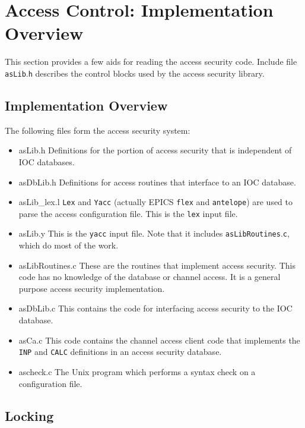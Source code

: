 \section{Access Control: Implementation Overview}

This section provides a few aids for reading the access security code. Include file \verb|asLib|.\verb|h| describes the control blocks 
used by the access security library. 

\subsection{Implementation Overview}

The following files form the access security system:

\begin{itemize}\item asLib.h  Definitions for the portion of access security that is independent of IOC databases.

\item asDbLib.h  Definitions for access routines that interface to an IOC database.

\item asLib\_lex.l   \verb|Lex| and \verb|Yacc| (actually EPICS \verb|flex| and \verb|antelope|) are used to parse the access configuration file. 
This is the \verb|lex| input file.

\item asLib.y   This is the \verb|yacc| input file. Note that it includes \verb|asLibRoutines|.\verb|c|, which do most of the work.

\item asLibRoutines.c   These are the routines that implement access security. This code has no knowledge of the 
database or channel access. It is a general purpose access security implementation.

\item asDbLib.c   This contains the code for interfacing access security to the IOC database.

\item asCa.c   This code contains the channel access client code that implements the \verb|INP| and \verb|CALC| definitions in an 
access security database.

\item ascheck.c   The Unix program which performs a syntax check on a configuration file.

\end{itemize}\subsection{Locking}

